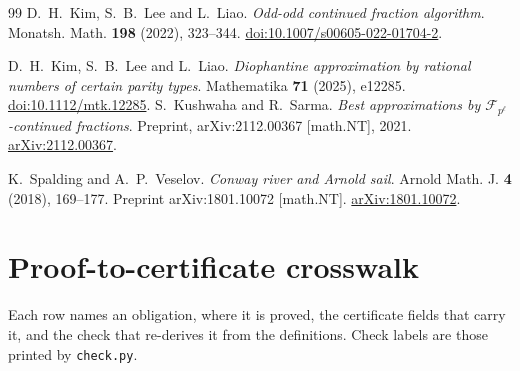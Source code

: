 \documentclass[11pt]{article}
\theoremstyle{definition}
\theoremstyle{remark}
\begin{document}
\begin{thebibliography}{99}
 D.~H.~Kim, S.~B.~Lee and L.~Liao. \emph{Odd-odd continued fraction
algorithm}. Monatsh. Math. \textbf{198} (2022), 323--344.
\href{https://doi.org/10.1007/s00605-022-01704-2}{doi:10.1007/s00605-022-01704-2}.

 D.~H.~Kim, S.~B.~Lee and L.~Liao. \emph{Diophantine approximation by
rational numbers of certain parity types}. Mathematika \textbf{71} (2025), e12285.
\href{https://doi.org/10.1112/mtk.12285}{doi:10.1112/mtk.12285}.
 S.~Kushwaha and R.~Sarma. \emph{Best approximations by
$\mathcal F_{p^\ell}$-continued fractions}. Preprint, arXiv:2112.00367 [math.NT], 2021.
\href{https://arxiv.org/abs/2112.00367}{arXiv:2112.00367}.

 K.~Spalding and A.~P.~Veselov. \emph{Conway river and Arnold sail}.
Arnold Math. J. \textbf{4} (2018), 169--177. Preprint arXiv:1801.10072 [math.NT].
\href{https://arxiv.org/abs/1801.10072}{arXiv:1801.10072}.
\end{thebibliography}

\appendix

\section{Proof-to-certificate crosswalk}\label{app:crosswalk}

Each row names an obligation, where it is proved, the certificate fields that carry it, and the
check that re-derives it from the definitions. Check labels are those printed by
\texttt{check.py}.
\end{document}
